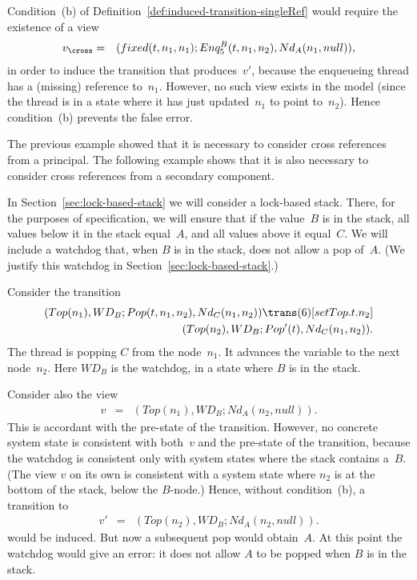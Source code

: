 Condition~(b) of Definition~\ref{def:induced-transition-singleRef} would
require the existence of a view
\begin{eqnarray*}
v_\cross & = & (fixed(t, n_1, n_1); Enq_5^B(t, n_1, n_2), Nd_A(n_1, null)),
\end{eqnarray*}
in order to induce the transition that produces~$v'$, because the enqueueing
thread has a (missing) reference to~$n_1$.  However, no such view exists in
the model (since the thread is in a state where it has just updated~$n_1$ to
point to~$n_2$).  Hence condition~(b) prevents the false error.


The previous example showed that it is necessary to consider cross references
from a principal.  The following example shows that it is also necessary to
consider cross references from a secondary component.  

In Section~\ref{sec:lock-based-stack} we will consider a lock-based stack.
There, for the purposes of specification, we will ensure that if the value~$B$
is in the stack, all values below it in the stack equal~$A$, and all values
above it equal~$C$.  We will include a watchdog that, when $B$ is in the
stack, does not allow a pop of~$A$.  (We justify this watchdog in
Section~\ref{sec:lock-based-stack}.) 

Consider the transition
\[
\begin{align}
(Top(n_1), WD_B ; Pop(t, n_1, n_2), Nd_C(n_1, n_2)) \trans(6)[setTop.t.n_2] \\
\qquad  (Top(n_2), WD_B ; Pop'(t), Nd_C(n_1, n_2)) .
\end{align}
\]
The thread is popping $C$ from the node~$n_1$.  It advances the
 variable to the next node~$n_2$.  Here $WD_B$ is the watchdog, in
a state where $B$ is in the stack.  

Consider also the view
\begin{eqnarray*}
v & = & (Top(n_1), WD_B ;  Nd_A(n_2, null)).
\end{eqnarray*}
This is accordant with the pre-state of the transition.  However, no concrete
system state is consistent with both~$v$ and the pre-state of the transition,
because the watchdog is consistent only with system states where the stack
contains a~$B$.  (The view $v$ on its own is consistent with a system state
where $n_2$ is at the bottom of the stack, below the $B$-node.)  Hence,
without condition~(b), a transition to
\begin{eqnarray*}
v' & = & (Top(n_2), WD_B ;  Nd_A(n_2, null)).
\end{eqnarray*}
would be induced.  But now a subsequent pop would obtain~$A$.  At this point
the watchdog would give an error: it does not allow $A$ to be popped when $B$
is in the stack.

